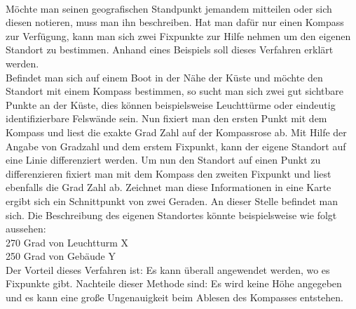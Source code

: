\\Möchte man seinen geografischen Standpunkt jemandem mitteilen oder sich diesen notieren, muss man ihn beschreiben. Hat man dafür nur einen Kompass zur Verfügung, kann man sich zwei Fixpunkte zur Hilfe nehmen um den eigenen Standort zu bestimmen.
Anhand eines Beispiels soll dieses Verfahren erklärt werden. 
\\Befindet man sich auf einem Boot in der Nähe der Küste und möchte den Standort mit einem Kompass bestimmen, so sucht man sich zwei gut sichtbare Punkte an der Küste, dies können beispielsweise Leuchttürme oder eindeutig identifizierbare Felswände sein. Nun fixiert man den ersten Punkt mit dem Kompass und liest die exakte Grad Zahl auf der Kompassrose ab. Mit Hilfe der Angabe von Gradzahl und dem erstem Fixpunkt, kann der eigene Standort auf eine Linie differenziert werden. Um nun den Standort auf einen Punkt zu differenzieren fixiert man mit dem Kompass den zweiten Fixpunkt und liest ebenfalls die Grad Zahl ab. Zeichnet man diese Informationen in eine Karte ergibt sich ein Schnittpunkt von zwei Geraden. An dieser Stelle befindet man sich. Die Beschreibung des eigenen Standortes könnte beispielsweise wie folgt aussehen:
\\270 Grad von Leuchtturm X
\\250 Grad von Gebäude Y
\\Der Vorteil dieses Verfahren ist: Es kann überall angewendet werden, wo es Fixpunkte gibt.
Nachteile dieser Methode sind: Es wird keine Höhe angegeben und es kann eine große Ungenauigkeit beim Ablesen des Kompasses entstehen.

